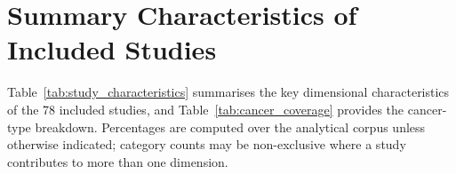
\section{Summary Characteristics of Included Studies}
\label{app:S1}

Table~\ref{tab:study_characteristics} summarises the key dimensional characteristics of the 78 included studies, and Table~\ref{tab:cancer_coverage} provides the cancer-type breakdown. Percentages are computed over the analytical corpus unless otherwise indicated; category counts may be non-exclusive where a study contributes to more than one dimension.

